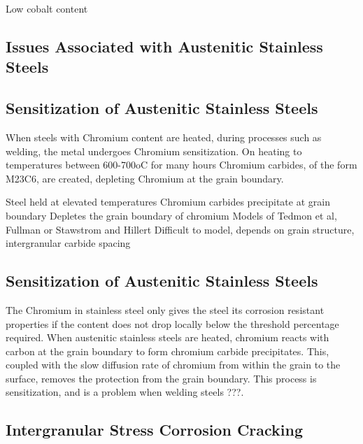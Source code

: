 Low cobalt content



\subsection{Issues Associated with Austenitic Stainless Steels}


\subsection{Sensitization of Austenitic Stainless Steels}






When steels with Chromium content are heated, during processes such as welding, the metal undergoes Chromium sensitization.  On heating to temperatures between 600-700oC for many hours Chromium carbides, of the form M23C6, are created, depleting Chromium at the grain boundary.

Steel held at elevated temperatures
Chromium carbides precipitate at grain boundary
Depletes the grain boundary of chromium
Models of Tedmon et al, Fullman or Stawstrom and Hillert
Difficult to model, depends on grain structure, intergranular carbide spacing

\subsection{Sensitization of Austenitic Stainless Steels}

The Chromium in stainless steel only gives the steel its corrosion resistant properties if the content does not drop locally below the threshold percentage required.  When austenitic stainless steels are heated, chromium reacts with carbon at the grain boundary to form chromium carbide precipitates.  This, coupled with the slow diffusion rate of chromium from within the grain to the surface, removes the protection from the grain boundary.  This process is sensitization, and is a problem when welding steels ???.



\subsection{Intergranular Stress Corrosion Cracking}









